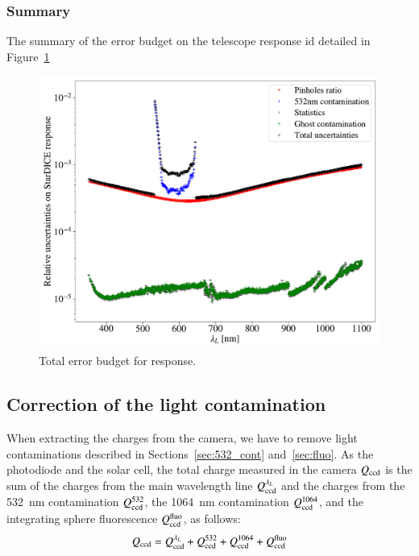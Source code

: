 \subsubsection{Summary}

The summary of the error budget on the \SD telescope response id detailed in Figure~\ref{fig:sd_budget}


\begin{figure}
    \centering
    \includegraphics[width=\columnwidth]{fig/sd_uncertainties_budget.pdf}
    \caption{Total error budget for \SD response.}
    \label{fig:sd_budget}
\end{figure}


\subsection{Correction of the light contamination}\label{sec:sd_contaminations}

When extracting the charges from the \SD camera, we have to remove light contaminations described in Sections~\ref{sec:532_cont} and~\ref{sec:fluo}. As the photodiode and the solar cell, the total charge measured in the \SD camera $Q_{\mathrm{ccd}}$ is the sum of the charges from the main wavelength line $Q_{\mathrm{ccd}}^{\lambda_L}$ and the charges from the \SI{532}{\nm} contamination $Q_{\mathrm{ccd}}^{532}$, the \SI{1064}{\nm} contamination $Q_{\mathrm{ccd}}^{1064}$, and the integrating sphere fluorescence $Q_{\mathrm{ccd}}^{\mathrm{fluo}}$, as follows:
\begin{equation}
    Q_{\mathrm{ccd}} = Q_{\mathrm{ccd}}^{\lambda_L} + Q_{\mathrm{ccd}}^{532} + Q_{\mathrm{ccd}}^{1064} + Q_{\mathrm{ccd}}^{\mathrm{fluo}}
    \label{eq:qccd_mes}
\end{equation}

